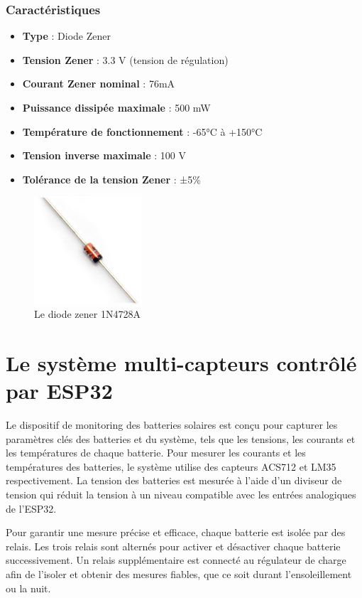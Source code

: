 \subsubsection*{Caractéristiques}

\begin{itemize}[label={--}]
	\item \textbf{Type} : Diode Zener
	\item \textbf{Tension Zener} : 3.3 V (tension de régulation)
	\item \textbf{Courant Zener nominal} : 76mA
	\item \textbf{Puissance dissipée maximale} : 500 mW
	\item \textbf{Température de fonctionnement} : -65°C à +150°C
	\item \textbf{Tension inverse maximale} : 100 V
	\item \textbf{Tolérance de la tension Zener} : ±5\%
\end{itemize}
\begin{figure}[H]
	\centering
	\includegraphics[width=4cm]{./img/composants/1n4728.jpg}
	\caption{Le diode zener 1N4728A}
	\label{fig:relais_5vdc}
\end{figure}
\section{Le système multi-capteurs contrôlé par ESP32}

Le dispositif de monitoring des batteries solaires est conçu pour capturer les paramètres clés des batteries et du système, tels que les tensions, les courants et les températures de chaque batterie. Pour mesurer les courants et les températures des batteries, le système utilise des capteurs ACS712 et LM35 respectivement. La tension des batteries est mesurée à l'aide d'un diviseur de tension qui réduit la tension à un niveau compatible avec les entrées analogiques de l'ESP32.

Pour garantir une mesure précise et efficace, chaque batterie est isolée par des relais. Les trois relais sont alternés pour activer et désactiver chaque batterie successivement. Un relais supplémentaire est connecté au régulateur de charge afin de l'isoler et obtenir des mesures fiables, que ce soit durant l'ensoleillement ou la nuit.

